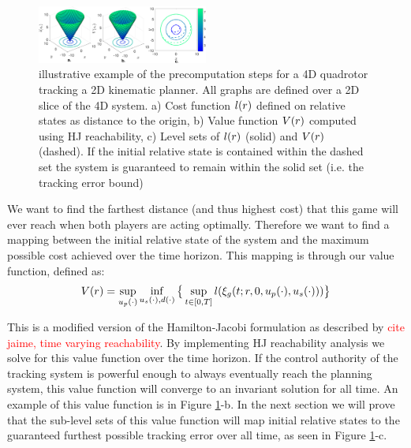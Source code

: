 \begin{figure}
	\centering
	\includegraphics[width=0.5\textwidth]{fig/quad4D_example}
	\caption{illustrative example of the precomputation steps for a 4D quadrotor tracking a 2D kinematic planner. All graphs are defined over a 2D slice of the 4D system. a) Cost function $l(r)$ defined on relative states as distance to the origin, b) Value function $V(r)$ computed using HJ reachability, c) Level sets of $l(r)$ (solid) and $V(r)$ (dashed). If the initial relative state is contained within the dashed set the system is guaranteed to remain within the solid set (i.e. the tracking error bound)}
	\label{fig:quad4D_example}
\end{figure} 
 
 We want to find the farthest distance (and thus highest cost) that this game will ever reach when both players are acting optimally. Therefore we want to find a mapping between the initial relative state of the system and the maximum possible cost achieved over the time horizon. This mapping is through our value function, defined as: 
 \begin{equation}
 \begin{aligned}
 	V(r)= \sup_{u_p(\cdot)} \inf_{u_s(\cdot), d(\cdot)} \big\{\sup_{t\in [0, T]} l(\xi_g(t; r, 0, u_p(\cdot), u_s(\cdot)))\big\}
 	\end{aligned}
 \end{equation} 
 
 This is a modified version of the Hamilton-Jacobi formulation as described by \textcolor{red}{cite jaime, time varying reachability}. By implementing HJ reachability analysis we solve for this value function over the time horizon. If the control authority of the tracking system is powerful enough to always eventually reach the planning system, this value function will converge to an invariant solution for all time. An example of this value function is in Figure \ref{fig:quad4D_example}-b. In the next section we will prove that the sub-level sets of this value function will map initial relative states to the guaranteed furthest possible tracking error over all time, as seen in Figure \ref{fig:quad4D_example}-c.
 
